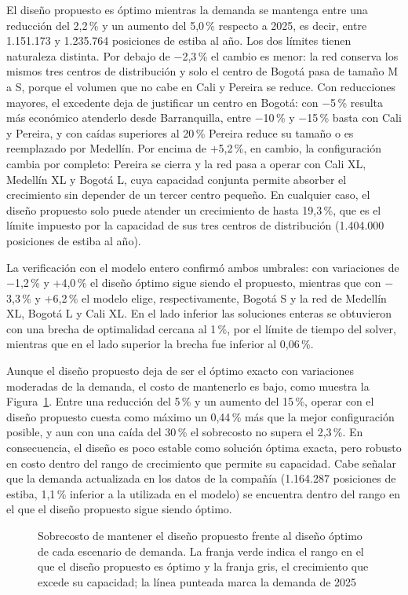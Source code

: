 \documentclass[fleqn, 11pt,letterpaper]{article}
\begin{document}
El diseño propuesto es óptimo mientras la demanda se mantenga entre una reducción del 2,2\,\% y un aumento del 5,0\,\% respecto a 2025, es decir, entre 1.151.173 y 1.235.764 posiciones de estiba al año. Los dos límites tienen naturaleza distinta. Por debajo de $-$2,3\,\% el cambio es menor: la red conserva los mismos tres centros de distribución y solo el centro de Bogotá pasa de tamaño M a S, porque el volumen que no cabe en Cali y Pereira se reduce. Con reducciones mayores, el excedente deja de justificar un centro en Bogotá: con $-$5\,\% resulta más económico atenderlo desde Barranquilla, entre $-$10\,\% y $-$15\,\% basta con Cali y Pereira, y con caídas superiores al 20\,\% Pereira reduce su tamaño o es reemplazado por Medellín. Por encima de +5,2\,\%, en cambio, la configuración cambia por completo: Pereira se cierra y la red pasa a operar con Cali XL, Medellín XL y Bogotá L, cuya capacidad conjunta permite absorber el crecimiento sin depender de un tercer centro pequeño. En cualquier caso, el diseño propuesto solo puede atender un crecimiento de hasta 19,3\,\%, que es el límite impuesto por la capacidad de sus tres centros de distribución (1.404.000 posiciones de estiba al año).

La verificación con el modelo entero confirmó ambos umbrales: con variaciones de $-$1,2\,\% y +4,0\,\% el diseño óptimo sigue siendo el propuesto, mientras que con $-$3,3\,\% y +6,2\,\% el modelo elige, respectivamente, Bogotá S y la red de Medellín XL, Bogotá L y Cali XL. En el lado inferior las soluciones enteras se obtuvieron con una brecha de optimalidad cercana al 1\,\%, por el límite de tiempo del solver, mientras que en el lado superior la brecha fue inferior al 0,06\,\%.

Aunque el diseño propuesto deja de ser el óptimo exacto con variaciones moderadas de la demanda, el costo de mantenerlo es bajo, como muestra la Figura~\ref{fig:sensibilidad}. Entre una reducción del 5\,\% y un aumento del 15\,\%, operar con el diseño propuesto cuesta como máximo un 0,44\,\% más que la mejor configuración posible, y aun con una caída del 30\,\% el sobrecosto no supera el 2,3\,\%. En consecuencia, el diseño es poco estable como solución óptima exacta, pero robusto en costo dentro del rango de crecimiento que permite su capacidad. Cabe señalar que la demanda actualizada en los datos de la compañía (1.164.287 posiciones de estiba, 1,1\,\% inferior a la utilizada en el modelo) se encuentra dentro del rango en el que el diseño propuesto sigue siendo óptimo.

\begin{figure}[H]
    \centering
    
    \caption{Sobrecosto de mantener el diseño propuesto frente al diseño óptimo de cada escenario de demanda. La franja verde indica el rango en el que el diseño propuesto es óptimo y la franja gris, el crecimiento que excede su capacidad; la línea punteada marca la demanda de 2025}
    \label{fig:sensibilidad}
\end{figure}
\end{document}
